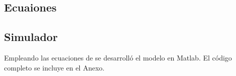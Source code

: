 \subsection{Ecuaiones}



\subsection{Simulador}

Empleando las ecuaciones de \cite{li} se desarrolló el 
modelo en Matlab. El código completo se incluye en el Anexo.
